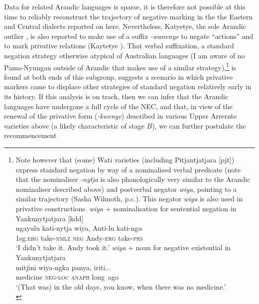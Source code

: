 \documentclass[output=paper,draft,draftmode,colorlinks,citecolor=brown]{langscibook}
\begin{document}
\largerpage[-1]
Data for related Arandic languages is sparse, it is therefore not possible
at this time to reliably reconstruct the trajectory of negative
marking in the the Eastern and Central dialects reported on here.
Nevertheless, Katyetye, the sole Arandic outlier
\citep[see][]{Hale1962,Koch2004}, is also reported to make use of a
suffix \textit{-wanenye} to negate ``actions'' and to mark
privative relations (Kaytetye \citeyear[826]{KaytetyeDict}). That
verbal suffixation, a standard negation strategy otherwise atypical
of Australian languages (I am aware of no Pama-Nyungan outside of
Arandic that makes use of a similar strategy),\footnote{Note
    however that (some) Wati varieties (including
    Pitjantjatjara [pjt]) express standard negation by way of a nominalised verbal predicate (note that the nominaliser \textit{-nytja} is also phonologically very similar to the Arandic nominaliser described above) and postverbal negator \textit{wiya}, pointing to a similar trajectory (Sasha Wilmoth, p.c.). This negator \textit{wiya} is also used in privative constructions.
    \ea
    \ea \textit{wiya} + nominalisation for sentential negation in
        Yankunytjatjara [kdd]\\
    \gll ngayulu kati-nytja wiya, Anti-lu kati-ngu\\
    1sg.\textsc{erg} take-\textsc{nmlz} \textsc{neg} Andy-\textsc{erg} take-\textsc{prs}\\
    \glt `I didn't take it. Andy took it.'\citep[244]{Goddard1983}
    \ex \textit{wiya} + noun for negative existential in Yankunytjatjara\\
    \gll mitjini wiya-ngka panya, iriti...\\
    medicine \textsc{neg}-\textsc{loc} \textsc{anaph} long~ago\\
    \glt `(That was) in the old days, you know, when there was no medicine.'\\
    \citep[39]{Goddard1983}
    \z\zlast
    }
is found at both ends of this subgroup, suggests a scenario in which privative markers came to displace other strategies of standard negation
relatively early in its history.
If this analysis is on track, then we can
infer that the Arandic languages have undergone a full cycle of the NEC,
and that, in view of the renewal of the privative form (\textit{-kwenye})
described in various Upper Arrernte varieties above (a likely
characteristic of stage $B$), we can further postulate the recommencement
\end{document}
